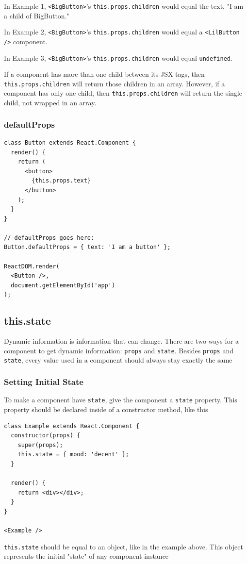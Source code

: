 \documentclass[a4paper, 12pt]{article}
\begin{document}
In Example 1, \verb|<BigButton>|'s \verb|this.props.children| would equal the text, "I am a child of BigButton."

In Example 2, \verb|<BigButton>|'s \verb|this.props.children| would equal a \verb|<LilButton />| component.

In Example 3, \verb|<BigButton>|'s \verb|this.props.children| would equal \verb|undefined|.

If a component has more than one child between its JSX tags, then \verb|this.props.children| will return those children in an array. However, if a component has only one child, then \verb|this.props.children| will return the single child, not wrapped in an array.

\subsubsection{defaultProps}
\begin{verbatim}
class Button extends React.Component {
  render() {
    return (
      <button>
        {this.props.text}
      </button>
    );
  }
}

// defaultProps goes here:
Button.defaultProps = { text: 'I am a button' };

ReactDOM.render(
  <Button />, 
  document.getElementById('app')
);
\end{verbatim}

\subsection{this.state}
Dynamic information is information that can change. There are two ways for a component to get dynamic information: \verb|props| and \verb|state|. Besides \verb|props| and \verb|state|, every value used in a component should always stay exactly the same

\subsubsection{Setting Initial State}
To make a component have \verb|state|, give the component a \verb|state| property. This property should be declared inside of a constructor method, like this
\begin{verbatim}
class Example extends React.Component {
  constructor(props) {
    super(props);
    this.state = { mood: 'decent' };
  }

  render() {
    return <div></div>;
  }
}

<Example />
\end{verbatim}
\verb|this.state| should be equal to an object, like in the example above. This object represents the initial "state" of any component instance
\end{document}
